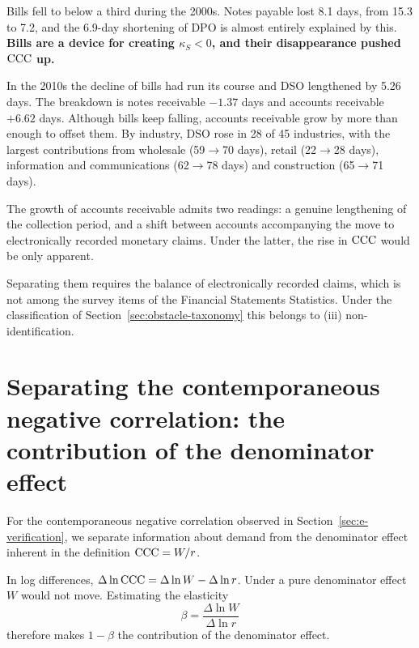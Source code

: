 Bills fell to below a third during the 2000s. Notes payable lost 8.1 days, from 15.3 to 7.2,
and the 6.9-day shortening of DPO is almost entirely explained by this.
\textbf{Bills are a device for creating $\kappa_S<0$, and their disappearance pushed $\mathrm{CCC}$ up.}

In the 2010s the decline of bills had run its course and DSO lengthened by 5.26 days. The
breakdown is notes receivable $-1.37$ days and accounts receivable $+6.62$ days. Although bills
keep falling, accounts receivable grow by more than enough to offset them. By industry,
$\mathrm{DSO}$ rose in 28 of 45 industries, with the largest contributions from wholesale
(59$\to$70 days), retail (22$\to$28 days), information and communications (62$\to$78 days) and
construction (65$\to$71 days).

\begin{remark}
\label{rem:densai}
The growth of accounts receivable admits two readings: a genuine lengthening of the collection
period, and a shift between accounts accompanying the move to electronically recorded monetary
claims. Under the latter, the rise in $\mathrm{CCC}$ would be only apparent.

Separating them requires the balance of electronically recorded claims, which is not among the
survey items of the Financial Statements Statistics. Under the classification of
Section~\ref{sec:obstacle-taxonomy} this belongs to (iii) non-identification.
\end{remark}

\section[Separating the contemporaneous negative correlation]{Separating the contemporaneous negative correlation: the contribution of the denominator effect}
\label{sec:denominator-effect}

For the contemporaneous negative correlation observed in Section~\ref{sec:e-verification}, we
separate information about demand from the denominator effect inherent in the definition
$\mathrm{CCC}=W/r$.

In log differences, $\Delta\ln\mathrm{CCC} = \Delta\ln W - \Delta\ln r$. Under a pure denominator effect
$W$ would not move. Estimating the elasticity
\begin{equation}
\beta = \frac{\Delta \ln W}{\Delta \ln r}
\label{eq:wc-elasticity}
\end{equation}
therefore makes $1-\beta$ the contribution of the denominator effect.

